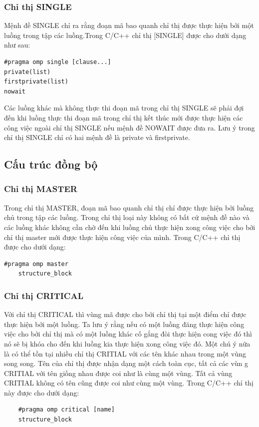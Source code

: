 \documentclass{report}
\begin{document}
\subsubsection{Chỉ thị SINGLE}
Mệnh đề SINGLE chỉ ra rằng đoạn mã bao quanh chỉ thị được thực hiện bởi một luồng trong tập các luồng.Trong C/C++ chỉ thị \textsf[SINGLE] được cho dưới dạng như sau:
\begin{verbatim}
#pragma omp single [clause...]
private(list)
firstprivate(list)
nowait
\end{verbatim}
 Các luồng khác mà không thực thi đoạn mã trong chỉ thị \textsf{SINGLE} sẽ phải đợi đến khi luồng thực thi đoạn mã trong chỉ thị kết thúc mới được thực hiện các công việc ngoài chỉ thị \textsf{SINGLE} nếu mệnh đề \textsf{NOWAIT} được đưa ra. Lưu ý trong chỉ thị \textsf{SINGLE} chỉ có hai mệnh đề là private và firstprivate.
 
 \subsection{Cấu trúc đồng bộ}
\subsubsection{Chỉ thị MASTER}
Trong chỉ thị \textsf{MASTER}, đoạn mã bao quanh chỉ thị chỉ được thực hiện bởi luồng chủ trong tập các luồng. Trong chỉ thị loại này không có bất cứ mệnh đề nào và các luồng khác không cần chờ đến khi luồng chủ thực hiện xong công việc cho bởi chỉ thị master mới được thực hiện công việc của mình. Trong C/C++ chỉ thị được cho dưới dạng:
\begin{verbatim}
#pragma omp master
	structure_block
	\end{verbatim}
	
	\subsubsection{Chỉ thị CRITICAL}
	Với chỉ thị \textsf{CRITICAL} thì vùng mã được cho bởi chỉ thị tại một điểm chỉ được thực hiện bởi một luồng. Ta lưu ý rằng nếu có một luồng đăng thực hiện công  việc cho bởi chỉ thị mà có một luồng khác cố gắng đòi thực hiện cong việc đó thì nó sẽ bị khóa cho đến khi luồng kia thực hiện xong công việc đó. Một chú ý nữa là có thể tồn tại nhiều chỉ thị \textsf{CRITIAL} với các tên khác nhau trong một vùng song song. Tên của chỉ thị được nhận dạng một cách toàn cục, tất cả các vùn g \textsf{CRITIA}L với tên giống nhau được coi như là cùng một vùng. Tất cả vùng \textsf{CRITIAL} không có tên cũng được coi như cùng một vùng. Trong C/C++ chỉ thị này được cho dưới dạng: 
	\begin{verbatim}
	#pragma omp critical [name] 
	structure_block
	\end{verbatim}
	
\end{document}
